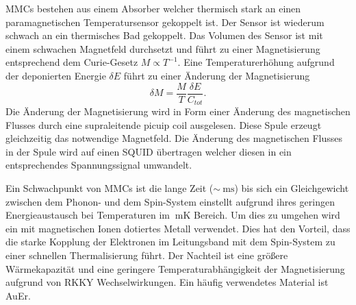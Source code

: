 MMCs bestehen aus einem Absorber welcher thermisch stark an einen paramagnetischen Temperatursensor gekoppelt ist.
Der Sensor ist wiederum schwach an ein thermisches Bad gekoppelt.
Das Volumen des Sensor ist mit einem schwachen Magnetfeld durchsetzt und führt zu einer Magnetisierung entsprechend dem Curie-Gesetz $M \propto T^{-1}$.
Eine Temperaturerhöhung aufgrund der deponierten Energie $\delta E$ führt zu einer Änderung der Magnetisierung
\begin{equation}
\delta M = \dfrac{M}{T}\frac{\delta E}{C_{tot}}.
\end{equation}
Die Änderung der Magnetisierung wird in Form einer Änderung des magnetischen Flusses durch eine supraleitende picuip coil ausgelesen.
Diese Spule erzeugt gleichzeitig das notwendige Magnetfeld.
Die Änderung des magnetischen Flusses in der Spule wird auf einen \ac{SQUID} übertragen welcher diesen in ein entsprechendes Spannungssignal umwandelt.

Ein Schwachpunkt von MMCs ist die lange Zeit ($\sim\SI{}{\milli\second}$) bis sich ein Gleichgewicht zwischen dem Phonon- und dem Spin-System einstellt aufgrund ihres geringen Energieaustausch bei Temperaturen im $\SI{}{\milli\kelvin}$ Bereich.
Um dies zu umgehen wird ein mit magnetischen Ionen dotiertes Metall verwendet.
Dies hat den Vorteil, dass die starke Kopplung der Elektronen im Leitungsband mit dem Spin-System zu einer schnellen Thermalisierung führt.
Der Nachteil ist eine größere Wärmekapazität und eine geringere Temperaturabhängigkeit der Magnetisierung aufgrund von \ac{RKKY} Wechselwirkungen.
Ein häufig verwendetes Material ist AuEr.



